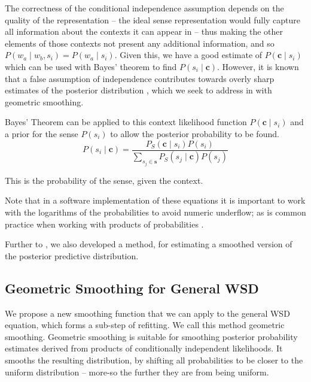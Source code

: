 \documentclass{sig-alternate}
\renewcommand{\c}{\mathbf{c}}
\newcommand{\s}{\mathbf{s}}
\begin{document}
The correctness of the conditional independence assumption depends on the quality of the representation -- the ideal sense representation would fully capture all information about the contexts it can appear in -- thus making the other elements of those contexts not present any additional information, and so  $P(w_a \mid w_b,s_i)=P(w_a \mid s_i)$. Given this, we have a good estimate of $P(\c \mid s_{i})$ which can be used with Bayes' theorem to find $P( s_i \mid \c)$. However, it is known that a false assumption of independence contributes towards overly sharp estimates of the posterior distribution \cite{rosenfeld2000two}, which we seek to address in  with geometric smoothing.


Bayes' Theorem can be applied to this context likelihood function  $P(\c \mid s_{i})$ and a prior for the sense $P(s_i)$ to allow the posterior probability to be found.
\begin{equation} \label{eq:generalwsd}
P(s_{i} \mid \c) =
\dfrac{P_S(\c \mid s_{i})P(s_{i})}
{\sum_{s_{j}\in\s} P_S(s_{j} \mid \c)P(s_{j})}
\end{equation}

This is the probability of the sense, given the context.

Note that in a software implementation of these equations it is important to work with the logarithms of the probabilities to avoid numeric underflow; as is common practice when working with products of probabilities \parencite{press2007numerical}.

Further to , we also developed a method, for estimating a smoothed version of the posterior predictive distribution.


\subsection{Geometric Smoothing for General WSD} \label{smoothing}
We propose a new smoothing function that we can apply to the general WSD equation, which forms a sub-step of refitting.
We call this method geometric smoothing.
Geometric smoothing is suitable for smoothing posterior probability estimates derived from products of conditionally independent likelihoods.
It smooths the resulting distribution, by shifting all probabilities to be closer to the uniform distribution -- more-so the further they are from being uniform.
\end{document}
